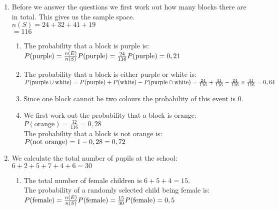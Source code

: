 \begin{solutions}{}{
\begin{enumerate}[itemsep=5pt, label=\textbf{\arabic*}. ] 

\item %
    Before we answer the questions we first work out how many blocks there are in total. This gives us the sample space.\\
    $n(S) = 24 + 32 + 41 + 19$\\
	 $= 116$
    \begin{enumerate}[noitemsep, label=\textbf{(\alph*)} ]

    \item The probability that a block is purple is:\\
    $P(\mbox{purple}) = \frac{n(E)}{n(S)}\\
     P(\mbox{purple}) = \frac{24}{116}\\
     P(\mbox{purple}) = 0,21$

    \item The probability that a block is either purple or white is:\\
    $P(\mbox{purple} \cup \mbox{white}) = P(\mbox{purple}) + P(\mbox{white}) - P(\mbox{purple} \cap \mbox{white})\\
    = \frac{24}{116} + \frac{41}{116} - \frac{24}{116} \times \frac{41}{116}\\
    = 0,64$

    \item Since one block cannot be two colours the probability of this event is $0$.

    \item We first work out the probability that a block is orange:\\
    $P(\mbox{orange}) = \frac{32}{116}
	       = 0,28$\\
    The probability that a block is not orange is:\\
    $P(\mbox{not orange}) = 1 - 0,28\\
		   = 0,72$
    \end{enumerate}
    
\item %
We calculate the total number of pupils at the school:\\
$6 + 2 + 5 + 7 + 4 + 6 = 30$
    \begin{enumerate}[noitemsep, label=\textbf{(\alph*)} ]
    \item The total number of female children is $6 + 5 + 4 = 15$.\\
    The probability of a randomly selected child being female is:\\
    $P(\mbox{female}) = \frac{n(E)}{n(S)}\\
     P(\mbox{female}) = \frac{15}{30}\\
     P(\mbox{female}) = 0,5$


\end{enumerate}
\end{enumerate}}
\end{solutions}
